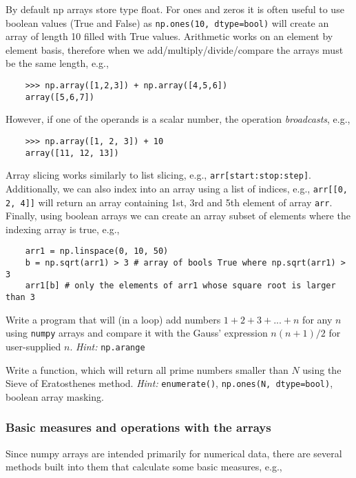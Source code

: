 By default np arrays store type float. For ones and zeros it is often useful to use boolean values (True and False) as \lstinline{np.ones(10, dtype=bool)} will create an array of length 10 filled with True values. Arithmetic works on an element by element basis, therefore when we add/multiply/divide/compare the arrays must be the same length, e.g.,
\begin{lstlisting}
    >>> np.array([1,2,3]) + np.array([4,5,6])
    array([5,6,7])
\end{lstlisting}
However, if one of the operands is a scalar number, the operation \emph{broadcasts}, e.g.,
\begin{lstlisting}
    >>> np.array([1, 2, 3]) + 10
    array([11, 12, 13])
\end{lstlisting}

Array slicing works similarly to list slicing, e.g., \lstinline{arr[start:stop:step]}. Additionally, we can also index into an array using a list of indices, e.g., \lstinline{arr[[0, 2, 4]]} will return an array containing 1st, 3rd and 5th element of array \lstinline{arr}. Finally, using boolean arrays we can create an array subset of elements where the indexing array is true, e.g.,
\begin{lstlisting}
    arr1 = np.linspace(0, 10, 50)
    b = np.sqrt(arr1) > 3 # array of bools True where np.sqrt(arr1) > 3
    arr1[b] # only the elements of arr1 whose square root is larger than 3
\end{lstlisting}

\begin{exercise}
    Write a program that will (in a loop) add numbers $1 + 2 + 3 + ... + n$ for any $n$ using \verb|numpy| arrays and compare it with the Gauss' expression $n(n+1)/2$ for user-supplied $n$. \emph{Hint:} \verb|np.arange|
\end{exercise}
\begin{exercise}
    Write a function, which will return all prime numbers smaller than $N$ using the Sieve of Eratosthenes method. \emph{Hint:} \verb|enumerate()|, \verb|np.ones(N, dtype=bool)|, boolean array masking.
\end{exercise}

\subsubsection{Basic measures and operations with the arrays}
Since numpy arrays are intended primarily for numerical data, there are several methods built into them that calculate some basic measures, e.g.,

